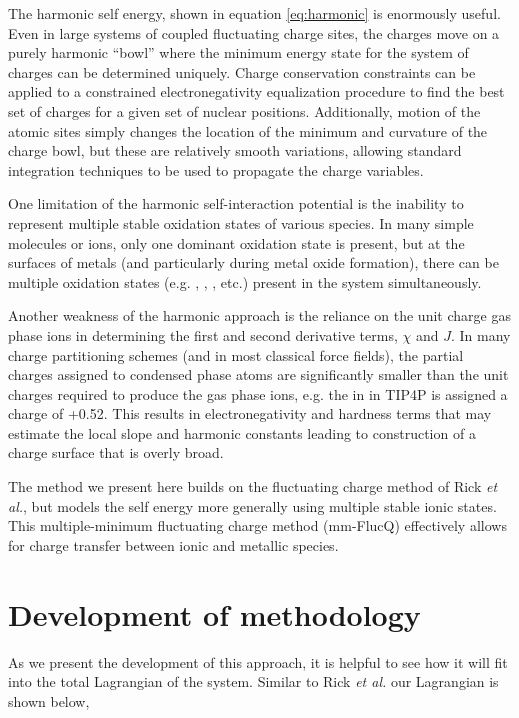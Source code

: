 The harmonic self energy, shown in equation \ref{eq:harmonic} is enormously useful.
Even in large systems of coupled fluctuating charge sites, the charges move on
a purely harmonic ``bowl'' where the minimum energy state for the system of
charges can be determined uniquely. Charge conservation constraints can be
applied to a constrained electronegativity equalization procedure to find the
best set of charges for a given set of nuclear positions.  Additionally, motion
of the atomic sites simply changes the location of the minimum and curvature of
the charge bowl, but these are relatively smooth variations, allowing standard
integration techniques to be used to propagate the charge variables.

One limitation of the harmonic self-interaction potential is the inability to
represent multiple stable oxidation states of various species. In many simple
molecules or ions, only one dominant oxidation state is present, but at the
surfaces of metals (and particularly during metal oxide formation), there can
be multiple oxidation states (e.g. , , , etc.)
present in the system simultaneously.

Another weakness of the harmonic approach is the reliance on the unit charge
gas phase ions in determining the first and second derivative terms, $\chi$ and
$J$.  In many charge partitioning schemes (and in most classical force fields),
the partial charges assigned to condensed phase atoms are significantly smaller
than the unit charges required to produce the gas phase ions, e.g. the 
in  in TIP4P is assigned a charge of +0.52.\citep{Jorgensen:1983tp}
This results in electronegativity and hardness terms that may estimate the
local slope and harmonic constants leading to construction of a charge surface
that is overly broad.

The method we present here builds on the fluctuating charge method of Rick {\it
et al.}\citep{Rick:1994ss}, but models the self energy more generally using
multiple stable ionic states.  This multiple-minimum fluctuating charge method
(mm-FlucQ) effectively allows for charge transfer between ionic and metallic
species.

\section{Development of methodology}

As we present the development of this approach, it is helpful to see how it
will fit into the total Lagrangian of the system. Similar to Rick {\it et
al.}\citep{Rick:1994ss} our Lagrangian is shown below,

